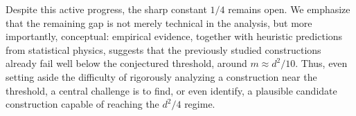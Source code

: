 \documentclass[12pt]{article}
\newcommand{\Lovasz}{Lov\'asz\xspace}
\newcommand{\Authornote}[3]{{\sf\footnotesize\color{#3}{[#1: #2]}}}
\newcommand{\Authornote}[3]{}
\newcommand{\snote}[1]{\Authornote{Sofia}{#1}{orange}}
\begin{document}


Despite this active progress, the sharp constant \(1/4\) remains open. We emphasize that the
remaining gap is not merely technical in the analysis, but more importantly, conceptual: empirical evidence,
together with heuristic predictions from statistical physics, suggests that the
previously studied constructions already fail well below the conjectured
threshold, around \(m\approx d^2/10\). Thus, even setting aside the difficulty of
rigorously analyzing a construction near the threshold, a central challenge is to
find, or even identify, a plausible candidate construction capable of reaching
the \(d^2/4\) regime.  

\end{document}
